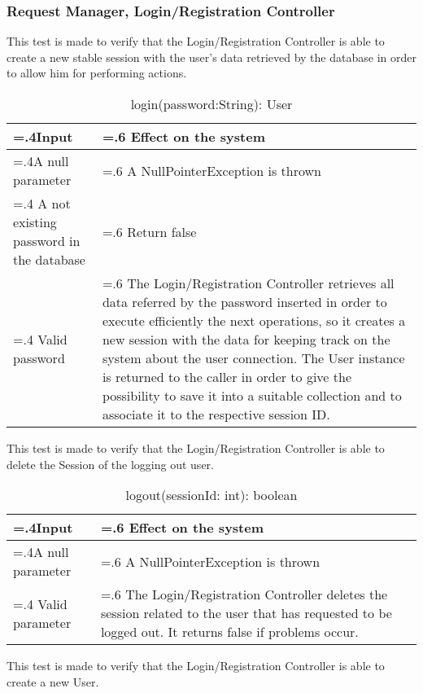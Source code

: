 \documentclass[10pt, a4paper,titlepage]{article}
\begin{document}
\subsubsection{Request Manager, Login/Registration Controller}
This test is made to verify that the Login/Registration Controller is able to create a new stable session with the user’s data retrieved by the database in order to allow him for performing actions.
\begin{table}[h]
\caption{login(password:String): User}
\begin{tabularx}{\textwidth}{|>{\hsize=.4\hsize}X|>{\hsize=.6\hsize}X|}
\hline
Input & Effect on the system\\
\hline
A null parameter & A NullPointerException is thrown\\ 
\hline
A not existing password in the database & Return false\\
\hline
Valid password & The Login/Registration Controller retrieves all data referred by the password inserted in order to execute efficiently the next operations, so it creates a new session with the data for keeping track on the system about the user connection. The User instance is returned to the caller in order to give the possibility to save it into a suitable collection and to associate it to the respective session ID.\\
\hline
\end{tabularx}
\end{table}
\linebreak
This test is made to verify that the Login/Registration Controller is able to delete the Session of the logging out user.
\begin{table}[h]
\caption{logout(sessionId: int): boolean}
\begin{tabularx}{\textwidth}{|>{\hsize=.4\hsize}X|>{\hsize=.6\hsize}X|}
\hline
Input & Effect on the system\\
\hline
A null parameter & A NullPointerException is thrown\\
\hline
Valid parameter & The Login/Registration Controller deletes the session related to the user that has requested to be logged out. It returns false if problems occur.\\
\hline
\end{tabularx}
\end{table}
\linebreak
This test is made to verify that the Login/Registration Controller is able to create a new User.
\end{document}
